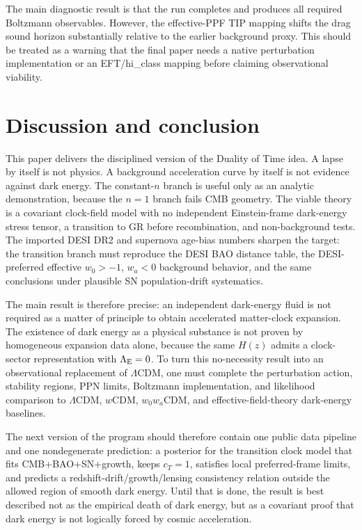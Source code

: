\documentclass[aps,prd,reprint,nofootinbib,superscriptaddress,longbibliography]{revtex4-2}
\newcommand{\LCDM}{$\Lambda$CDM}
\begin{document}
The main diagnostic result is that the run completes and produces all required Boltzmann observables. However, the effective-PPF TIP mapping shifts the drag sound horizon substantially relative to the earlier background proxy. This should be treated as a warning that the final paper needs a native perturbation implementation or an EFT/hi\_class mapping before claiming observational viability.


\section{Discussion and conclusion}

This paper delivers the disciplined version of the Duality of Time idea.  A lapse by itself is not physics.  A background acceleration curve by itself is not evidence against dark energy.  The constant-$n$ branch is useful only as an analytic demonstration, because the $n=1$ branch fails CMB geometry.  The viable theory is a covariant clock-field model with no independent Einstein-frame dark-energy stress tensor, a transition to GR before recombination, and non-background tests.  The imported DESI DR2 and supernova age-bias numbers sharpen the target: the transition branch must reproduce the DESI BAO distance table, the DESI-preferred effective $w_0>-1$, $w_a<0$ background behavior, and the same conclusions under plausible SN population-drift systematics.

The main result is therefore precise: an independent dark-energy fluid is not required as a matter of principle to obtain accelerated matter-clock expansion.  The existence of dark energy as a physical substance is not proven by homogeneous expansion data alone, because the same $H(z)$ admits a clock-sector representation with $\Lambda_{\rm E}=0$.  To turn this no-necessity result into an observational replacement of \LCDM, one must complete the perturbation action, stability regions, PPN limits, Boltzmann implementation, and likelihood comparison to \LCDM, $w$CDM, $w_0w_a$CDM, and effective-field-theory dark-energy baselines.

The next version of the program should therefore contain one public data pipeline and one nondegenerate prediction: a posterior for the transition clock model that fits CMB+BAO+SN+growth, keeps $c_T=1$, satisfies local preferred-frame limits, and predicts a redshift-drift/growth/lensing consistency relation outside the allowed region of smooth dark energy.  Until that is done, the result is best described not as the empirical death of dark energy, but as a covariant proof that dark energy is not logically forced by cosmic acceleration.
\end{document}

